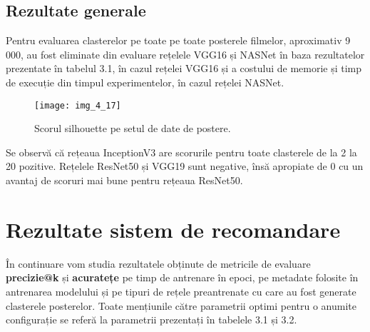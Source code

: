 \subsection{Rezultate generale}
Pentru evaluarea clasterelor pe toate pe toate posterele filmelor, aproximativ 9 000, au fost eliminate din evaluare rețelele VGG16 și NASNet în baza rezultatelor prezentate în tabelul 3.1, în cazul rețelei VGG16 și a costului de memorie și timp de execuție din timpul experimentelor, în cazul rețelei NASNet.
\begin{figure}[!h]
	\centering
	\texttt{[image: img\_4\_17]}
	\caption[Scorul silhouette pe setul de date de postere]{Scorul silhouette pe setul de date de postere.}
\end{figure} 
Se observă că rețeaua InceptionV3 are scorurile pentru toate clasterele de la 2 la 20 pozitive. Rețelele ResNet50 și VGG19 sunt negative, însă apropiate de 0 cu un avantaj de scoruri mai bune pentru rețeaua ResNet50.

\section{Rezultate sistem de recomandare}
În continuare vom studia rezultatele obținute de metricile de evaluare \textbf{precizie@k} și \textbf{acuratețe} pe timp de antrenare în epoci, pe metadate folosite în antrenarea modelului și pe tipuri de rețele preantrenate cu care au fost generate clasterele posterelor. Toate mențiunile către parametrii optimi pentru o anumite configurație se referă la parametrii prezentați în tabelele 3.1 și 3.2.

